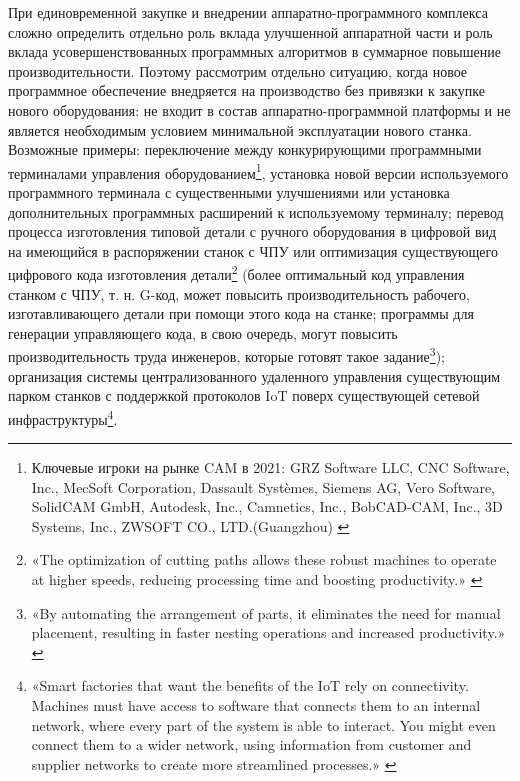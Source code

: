\documentclass{article}
\begin{document}
При единовременной закупке и внедрении аппаратно-программного комплекса сложно определить отдельно роль вклада улучшенной аппаратной части и роль вклада усовершенствованных программных алгоритмов в суммарное повышение производительности. Поэтому рассмотрим отдельно ситуацию, когда новое программное обеспечение внедряется на производство без привязки к закупке нового оборудования: не входит в состав аппаратно-программной платформы и не является необходимым условием минимальной эксплуатации нового станка. Возможные примеры: переключение между конкурирующими программными терминалами управления оборудованием\footnote{Ключевые игроки на рынке CAM в 2021: GRZ Software LLC, CNC Software, Inc., MecSoft Corporation, Dassault Systèmes, Siemens AG, Vero Software, SolidCAM GmbH, Autodesk, Inc., Camnetics, Inc., BobCAD-CAM, Inc., 3D Systems, Inc., ZWSOFT CO., LTD.(Guangzhou) \cite{camMarketStatus2021}}, установка новой версии используемого программного терминала с существенными улучшениями или установка дополнительных программных расширений к используемому терминалу; перевод процесса изготовления типовой детали с ручного оборудования в цифровой вид на имеющийся в распоряжении станок с ЧПУ или оптимизация существующего цифрового кода изготовления детали\footnote{«The optimization of cutting paths allows these robust machines to operate at higher speeds, reducing processing time and boosting productivity.» \cite{nestingSoftOverview}} (более оптимальный код управления станком с ЧПУ, т. н. G-код, может повысить производительность рабочего, изготавливающего детали при помощи этого кода на станке; программы для генерации управляющего кода, в свою очередь, могут повысить производительность труда инженеров, которые готовят такое задание\footnote{«By automating the arrangement of parts, it eliminates the need for manual placement, resulting in faster nesting operations and increased productivity.» \cite{autodeskNesting}}); организация системы централизованного удаленного управления существующим парком станков с поддержкой протоколов IoT поверх существующей сетевой инфраструктуры\footnote{«Smart factories that want the benefits of the IoT rely on connectivity. Machines must have access to software that connects them to an internal network, where every part of the system is able to interact. You might even connect them to a wider network, using information from customer and supplier networks to create more streamlined processes.» \cite{iotCncFactory}}. 
\end{document}
